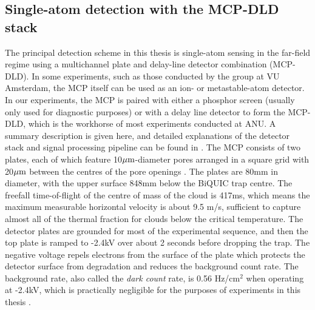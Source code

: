 \subsection*{Single-atom detection with the MCP-DLD stack}
	The principal detection scheme in this thesis is single-atom sensing in the far-field regime using a multichannel plate and delay-line detector combination (MCP-DLD). In some experiments, such as those conducted by the \mhe group at VU Amsterdam, the MCP itself can be used as an ion- or metastable-atom detector. In our experiments, the MCP is paired with either a phosphor screen (usually only used for diagnostic purposes) or with a delay line detector to form the MCP-DLD, which is the workhorse of most experiments conducted at ANU. A summary description is given here, and detailed explanations of the detector stack and signal processing pipeline can be found in \cite{ShinThesis, HodgmanThesis, ManningThesis}. The MCP consists of two plates, each of which feature 10$\mu\textrm{m}$-diameter pores arranged in a square grid with 20$\mu\textrm{m}$ between the centres of the pore openings . The plates are 80mm in diameter, with the upper surface 848mm below the BiQUIC trap centre. The freefall time-of-flight of the centre of mass of the cloud is 417ms, which means the maximum measurable horizontal velocity is about 9.5 m/s, sufficient to capture almost all of the thermal fraction for clouds below the critical temperature. The detector plates are grounded for most of the experimental sequence, and then the top plate is ramped to -2.4kV over about 2 seconds before dropping the trap. The negative voltage repels electrons from the surface of the plate which protects the detector surface from degradation and reduces the background count rate. The background rate, also called the \emph{dark count} rate, is 0.56 Hz/cm$^2$ when operating at -2.4kV, which is practically negligible for the purposes of experiments in this thesis . 

